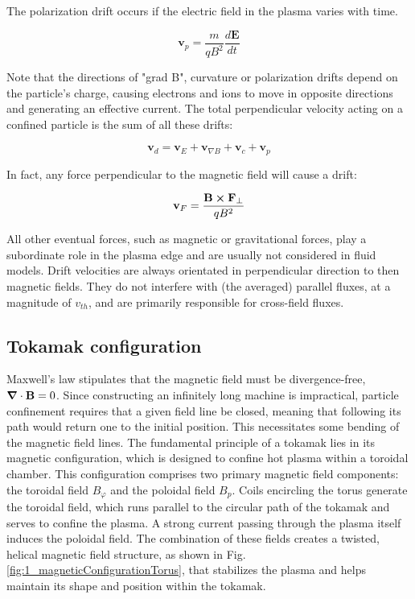 The polarization drift occurs if the electric field in the plasma varies with time. 

\begin{equation}
	\mathbf{v}_p = \frac{m}{qB^2}\frac{d\mathbf{E}}{dt}
\end{equation}

Note that the directions of "grad B", curvature or polarization drifts depend on the particle's charge, causing electrons and ions to move in opposite directions and generating an effective current. The total perpendicular velocity acting on a confined particle is the sum of all these drifts:

\begin{equation}
	\mathbf{v}_d = \mathbf{v}_E + \mathbf{v}_{\nabla B} + \mathbf{v}_c + \mathbf{v}_p
\end{equation}

In fact, any force perpendicular to the magnetic field will cause a drift:

\begin{equation}
	\mathbf{v}_F = \frac{\mathbf{B}\cross\mathbf{F}_\perp}{qB^2}
\end{equation}

All other eventual forces, such as magnetic or gravitational forces, play a subordinate role in the plasma edge and are usually not considered in fluid models. Drift velocities are always orientated in perpendicular direction to then magnetic fields. They do not interfere with (the averaged) parallel fluxes, at a magnitude of $v_{th}$, and are primarily responsible for cross-field fluxes.





\subsection{Tokamak configuration}
\label{ssec:intro_tokamakConfiguration}
Maxwell's law stipulates that the magnetic field must be divergence-free, \(\grad\cdot\mathbf{B} = 0\). Since constructing an infinitely long machine is impractical, particle confinement requires that a given field line be closed, meaning that following its path would return one to the initial position. This necessitates some bending of the magnetic field lines. \newline
The fundamental principle of a tokamak lies in its magnetic configuration, which is designed to confine hot plasma within a toroidal chamber. This configuration comprises two primary magnetic field components: the toroidal field \( B_\varphi \) and the poloidal field \( B_p \). Coils encircling the torus generate the toroidal field, which runs parallel to the circular path of the tokamak and serves to confine the plasma. A strong current passing through the plasma itself induces the poloidal field. The combination of these fields creates a twisted, helical magnetic field structure, as shown in Fig. \ref{fig:1_magneticConfigurationTorus}, that stabilizes the plasma and helps maintain its shape and position within the tokamak.


